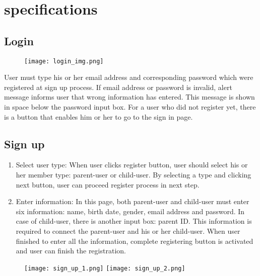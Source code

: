 \documentclass[conference]{IEEEtran}
\begin{document}
\section{specifications}

\subsection{Login}
\begin{figure}[H]
    \centering
    \texttt{[image: login\_img.png]}
    \end{figure}
    User must type his or her email address and corresponding password which were registered at sign up process. If email address or password is invalid, alert message informs user that wrong information has entered. This message is shown in space below the password input box. For a user who did not register yet, there is a button that enables him or her to go to the sign in page.
    
\subsection{Sign up}
    \begin{enumerate}
    \item Select user type: When user clicks register button, user should select his or her member type: parent-user or child-user. By selecting a type and clicking next button, user can proceed register process in next step.
    \item Enter information: In this page, both parent-user and child-user must enter six information: name, birth date, gender, email address and password. In case of child-user, there is another input box: parent ID. This information is required to connect the parent-user and his or her child-user. When user finished to enter all the information, complete registering button is activated and user can finish the registration.
    \end{enumerate}
    \begin{figure}[H]
    \centering
    \texttt{[image: sign\_up\_1.png]}
    \texttt{[image: sign\_up\_2.png]}
    \end{figure}
    
\end{document}
